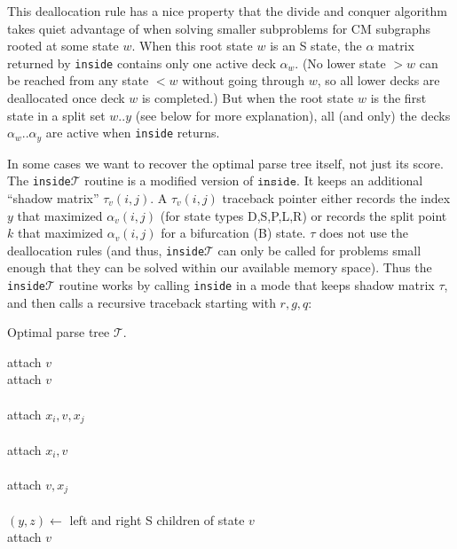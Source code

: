 \documentclass[11pt]{article}
\begin{document}
This deallocation rule has a nice property that the divide and conquer
algorithm takes quiet advantage of when solving smaller subproblems
for CM subgraphs rooted at some state $w$.  When this root state $w$
is an S state, the $\alpha$ matrix returned by \texttt{inside}
contains only one active deck $\alpha_w$. (No lower state $>w$ can be
reached from any state $<w$ without going through $w$, so all lower
decks are deallocated once deck $w$ is completed.) But when the root
state $w$ is the first state in a split set $w..y$ (see below for more
explanation), all (and only) the decks $\alpha_w..\alpha_y$ are active
when \texttt{inside} returns. 

In some cases we want to recover the optimal parse tree itself, not
just its score. The \texttt{inside}$\mathcal{T}$ routine is a modified
version of $\texttt{inside}$. It keeps an additional ``shadow matrix''
$\tau_v(i,j)$. A $\tau_v(i,j)$ traceback pointer either records the
index $y$ that maximized $\alpha_v(i,j)$ (for state types D,S,P,L,R)
or records the split point $k$ that maximized $\alpha_v(i,j)$ for a
bifurcation (B) state. $\tau$ does not use the deallocation rules (and
thus, \texttt{inside}$\mathcal{T}$ can only be called for problems
small enough that they can be solved within our available memory
space). Thus the \texttt{inside}$\mathcal{T}$ routine works by calling
\texttt{inside} in a mode that keeps shadow matrix $\tau$, and then
calls a recursive traceback starting with $r,g,q$:

\begin{algorithm}
         {Optimal parse tree $\mathcal{T}$.}
\begin{algtab}
    attach $v$\\
    attach $v$ \\
    \\
    attach $x_i,v,x_j$\\
    \\
    attach $x_i,v$\\
    \\
    attach $v,x_j$\\
    \\
    $(y,z) \leftarrow $ left and right S children of state $v$\\
    attach $v$\\
    \\
    \\
\algend
\end{algtab}
\end{algorithm}
\end{document}
